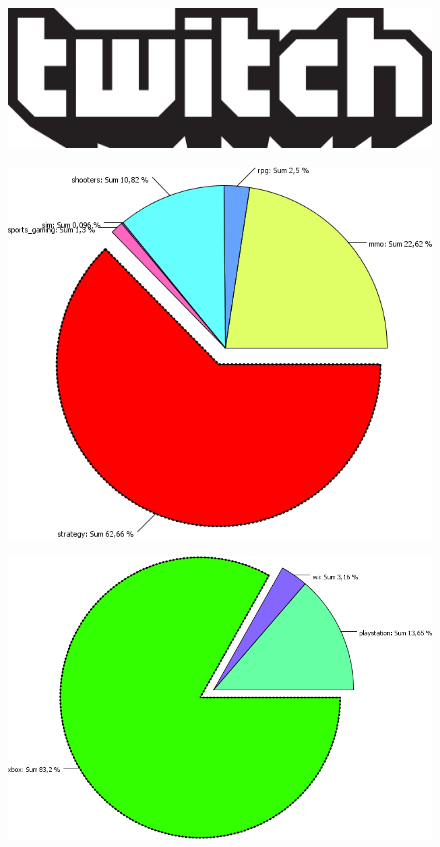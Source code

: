 \documentclass[11pt, a4paper, titlepage]{scrartcl}
\begin{document}
\begin{figure}[h]
    \centering
    \includegraphics[width=\textwidth]{images/logo}
    \caption{}
\end{figure}

\begin{figure}[h]
    \centering
    \includegraphics[width=\textwidth]{images/main_categories}
    \caption{}
\end{figure}

\begin{figure}[h]
    \centering
    \includegraphics[width=\textwidth]{images/main_consoles}
    \caption{}
\end{figure}
\end{document}
